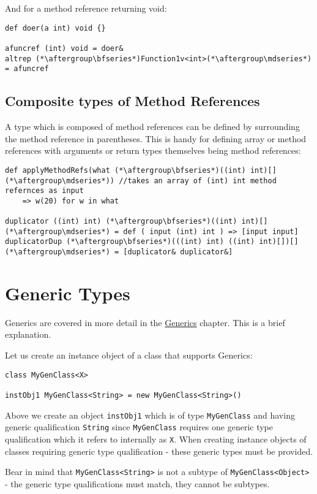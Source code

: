\documentclass[conc-doc]{subfiles}
\begin{document}
And for a method reference returning void:
\begin{lstlisting}
def doer(a int) void {}

afuncref (int) void = doer&
altrep (*\aftergroup\bfseries*)Function1v<int>(*\aftergroup\mdseries*) = afuncref
\end{lstlisting}


\subsection{Composite types of Method References}
A type which is composed of method references can be defined by surrounding the method reference in parentheses. This is handy for defining array or method references with arguments or return types themselves being method references:

\begin{lstlisting}
def applyMethodRefs(what (*\aftergroup\bfseries*)((int) int)[](*\aftergroup\mdseries*)) //takes an array of (int) int method refernces as input
	=> w(20) for w in what

duplicator ((int) int) (*\aftergroup\bfseries*)((int) int)[](*\aftergroup\mdseries*) = def ( input (int) int ) => [input input]
duplicatorDup (*\aftergroup\bfseries*)(((int) int) ((int) int)[])[](*\aftergroup\mdseries*) = [duplicator& duplicator&]
\end{lstlisting}

\section{Generic Types}
Generics are covered in more detail in the \hyperref[ch:generics]{Generics} chapter. This is a brief explanation.

Let us create an instance object of a class that supports Generics:
\begin{lstlisting}
class MyGenClass<X>

instObj1 MyGenClass<String> = new MyGenClass<String>()
\end{lstlisting}

Above we create an object \lstinline{instObj1} which is of type \lstinline{MyGenClass} and having generic qualification \lstinline{String} since \lstinline{MyGenClass} requires one generic type qualification which it refers to internally as \lstinline{X}. When creating instance objects of classes requiring generic type qualification - these generic types must be provided. 

Bear in mind that \lstinline{MyGenClass<String>} is not a subtype of \lstinline{MyGenClass<Object>} - the generic type qualifications must match, they cannot be subtypes.
\end{document}
